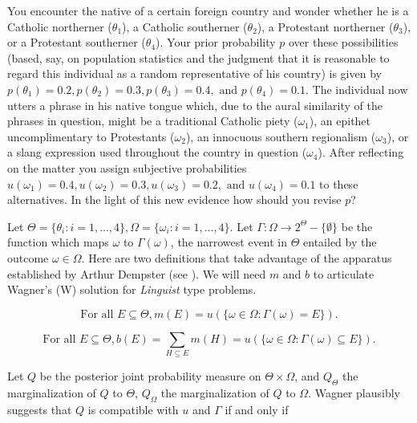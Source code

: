 \documentclass[phd,12pt,oneside]{ubcthesis}
\begin{document}
\begin{quotex}
  \label{ex:linguist} You encounter the native of a
  certain foreign country and wonder whether he is a Catholic
  northerner ($\theta_{1}$), a Catholic southerner ($\theta_{2}$), a
  Protestant northerner ($\theta_{3}$), or a Protestant southerner
  ($\theta_{4}$). Your prior probability $p$ over these possibilities
  (based, say, on population statistics and the judgment that it is
  reasonable to regard this individual as a random representative of
  his country) is given by
  $p(\theta_{1})=0.2,p(\theta_{2})=0.3,p(\theta_{3})=0.4,\mbox{ and
  }p(\theta_{4})=0.1$.
  The individual now utters a phrase in his native tongue which, due
  to the aural similarity of the phrases in question, might be a
  traditional Catholic piety ($\omega_{1}$), an epithet
  uncomplimentary to Protestants ($\omega_{2}$), an innocuous southern
  regionalism ($\omega_{3}$), or a slang expression used throughout
  the country in question ($\omega_{4}$). After reflecting on the
  matter you assign subjective probabilities
  $u(\omega_{1})=0.4,u(\omega_{2})=0.3,u(\omega_{3})=0.2,\mbox{ and
  }u(\omega_{4})=0.1$
  to these alternatives. In the light of this new evidence how should
  you revise $p$?
\end{quotex}

Let
$\Theta=\{\theta_{i}:i=1,\ldots,4\},\Omega=\{\omega_{i}:i=1,\ldots,4\}$.
Let $\Gamma:\Omega\rightarrow{}2^{\Theta}-\{\emptyset\}$ be the
function which maps $\omega$ to $\Gamma(\omega)$, the narrowest event
in $\Theta$ entailed by the outcome $\omega\in\Omega$. Here are two
definitions that take advantage of the apparatus established by Arthur
Dempster (see ). We will need $m$ and $b$ to
articulate Wagner's (W) solution for \emph{Linguist} type problems.

\begin{equation}
  \mbox{For all }E\subseteq{}\Theta, m(E)=u(\{\omega\in\Omega:\Gamma(\omega)=E\})\label{eq:mof}.
\end{equation}

\begin{equation}
  \mbox{For all }E\subseteq{}\Theta, b(E)=\sum_{H\subseteq{}E}m(H)=u(\{\omega\in\Omega:\Gamma(\omega)\subseteq{}E\})\label{eq:bof}.
\end{equation}

Let $Q$ be the posterior joint probability measure on
$\Theta\times\Omega$, and $Q_{\Theta}$ the marginalization of $Q$ to
$\Theta$, $Q_{\Omega}$ the marginalization of $Q$ to $\Omega$.
Wagner plausibly suggests that $Q$ is compatible with $u$ and $\Gamma$
if and only if
\end{document}
